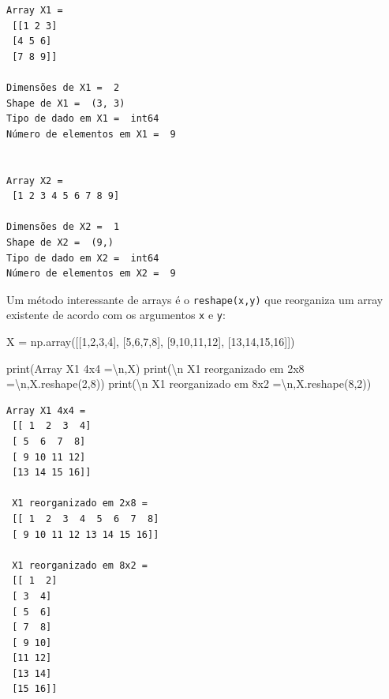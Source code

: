 \documentclass[
  brazilian,
  letterpaper,
  DIV=11,
  numbers=noendperiod]{scrreprt}
\newenvironment{Shaded}{\begin{snugshade}}{\end{snugshade}}
\newcommand{\BuiltInTok}[1]{\textcolor[rgb]{0.00,0.23,0.31}{#1}}
\newcommand{\CharTok}[1]{\textcolor[rgb]{0.13,0.47,0.30}{#1}}
\newcommand{\DecValTok}[1]{\textcolor[rgb]{0.68,0.00,0.00}{#1}}
\newcommand{\NormalTok}[1]{\textcolor[rgb]{0.00,0.23,0.31}{#1}}
\newcommand{\OperatorTok}[1]{\textcolor[rgb]{0.37,0.37,0.37}{#1}}
\newcommand{\StringTok}[1]{\textcolor[rgb]{0.13,0.47,0.30}{#1}}
\begin{document}
\begin{verbatim}
Array X1 =
 [[1 2 3]
 [4 5 6]
 [7 8 9]]

Dimensões de X1 =  2
Shape de X1 =  (3, 3)
Tipo de dado em X1 =  int64
Número de elementos em X1 =  9


Array X2 =
 [1 2 3 4 5 6 7 8 9]

Dimensões de X2 =  1
Shape de X2 =  (9,)
Tipo de dado em X2 =  int64
Número de elementos em X2 =  9
\end{verbatim}

Um método interessante de arrays é o \texttt{reshape(x,y)} que
reorganiza um array existente de acordo com os argumentos \texttt{x} e
\texttt{y}:

\begin{Shaded}
\begin{Highlighting}[]
\NormalTok{X }\OperatorTok{=}\NormalTok{ np.array([[}\DecValTok{1}\NormalTok{,}\DecValTok{2}\NormalTok{,}\DecValTok{3}\NormalTok{,}\DecValTok{4}\NormalTok{], [}\DecValTok{5}\NormalTok{,}\DecValTok{6}\NormalTok{,}\DecValTok{7}\NormalTok{,}\DecValTok{8}\NormalTok{], [}\DecValTok{9}\NormalTok{,}\DecValTok{10}\NormalTok{,}\DecValTok{11}\NormalTok{,}\DecValTok{12}\NormalTok{], [}\DecValTok{13}\NormalTok{,}\DecValTok{14}\NormalTok{,}\DecValTok{15}\NormalTok{,}\DecValTok{16}\NormalTok{]]) }

\BuiltInTok{print}\NormalTok{(}\StringTok{\textquotesingle{}Array X1 4x4 =}\CharTok{\textbackslash{}n}\StringTok{\textquotesingle{}}\NormalTok{,X)}
\BuiltInTok{print}\NormalTok{(}\StringTok{\textquotesingle{}}\CharTok{\textbackslash{}n}\StringTok{ X1 reorganizado em 2x8 =}\CharTok{\textbackslash{}n}\StringTok{\textquotesingle{}}\NormalTok{,X.reshape(}\DecValTok{2}\NormalTok{,}\DecValTok{8}\NormalTok{))}
\BuiltInTok{print}\NormalTok{(}\StringTok{\textquotesingle{}}\CharTok{\textbackslash{}n}\StringTok{ X1 reorganizado em 8x2 =}\CharTok{\textbackslash{}n}\StringTok{\textquotesingle{}}\NormalTok{,X.reshape(}\DecValTok{8}\NormalTok{,}\DecValTok{2}\NormalTok{))}
\end{Highlighting}
\end{Shaded}

\begin{verbatim}
Array X1 4x4 =
 [[ 1  2  3  4]
 [ 5  6  7  8]
 [ 9 10 11 12]
 [13 14 15 16]]

 X1 reorganizado em 2x8 =
 [[ 1  2  3  4  5  6  7  8]
 [ 9 10 11 12 13 14 15 16]]

 X1 reorganizado em 8x2 =
 [[ 1  2]
 [ 3  4]
 [ 5  6]
 [ 7  8]
 [ 9 10]
 [11 12]
 [13 14]
 [15 16]]
\end{verbatim}
\end{document}
